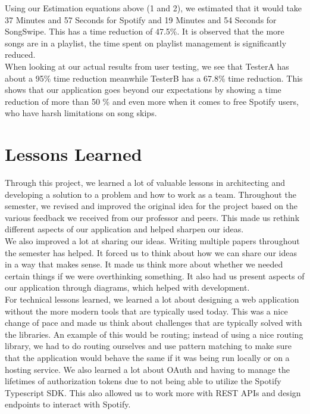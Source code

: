 \documentclass{article}
\begin{document}
Using our Estimation equations above (1 and 2), we estimated that it would take 37 Minutes and 57 Seconds for Spotify and 19 Minutes and 54 Seconds for SongSwipe. This has a time reduction of 47.5\%. It is observed that the more songs are in a playlist, the time spent on playlist management is significantly reduced.\\
    
When looking at our actual results from user testing, we see that TesterA has about a 95\% time reduction meanwhile TesterB has a 67.8\% time reduction. This shows that our application goes beyond our expectations by showing a time reduction of more than 50 \% and even more when it comes to free Spotify users, who have harsh limitations on song skips.

\section{Lessons Learned}

Through this project, we learned a lot of valuable lessons in architecting and developing a solution to a problem and how to work as a team. Throughout the semester, we revised and improved the original idea for the project based on the various feedback we received from our professor and peers. This made us rethink different aspects of our application and helped sharpen our ideas. \\

We also improved a lot at sharing our ideas. Writing multiple papers throughout the semester has helped. It forced us to think about how we can share our ideas in a way that makes sense. It made us think more about whether we needed certain things if we were overthinking something. It also had us present aspects of our application through diagrams, which helped with development. \\

For technical lessons learned, we learned a lot about designing a web application without the more modern tools that are typically used today. This was a nice change of pace and made us think about challenges that are typically solved with the libraries. An example of this would be routing; instead of using a nice routing library, we had to do routing ourselves and use pattern matching to make sure that the application would behave the same if it was being run locally or on a hosting service. We also learned a lot about OAuth and having to manage the lifetimes of authorization tokens due to not being able to utilize the Spotify Typescript SDK. This also allowed us to work more with REST APIs and design endpoints to interact with Spotify.
\end{document}
